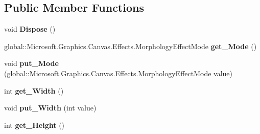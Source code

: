 \subsection*{Public Member Functions}
\begin{DoxyCompactItemize}
\item 
\mbox{\label{class_microsoft_1_1_graphics_1_1_canvas_1_1_effects_1_1_morphology_effect_a53c33ad9e69a2a3019abd0f92a5654ba}} 
void {\bfseries Dispose} ()
\item 
\mbox{\label{class_microsoft_1_1_graphics_1_1_canvas_1_1_effects_1_1_morphology_effect_abdb13862f058bf5f7dade04433564b08}} 
global\+::\+Microsoft.\+Graphics.\+Canvas.\+Effects.\+Morphology\+Effect\+Mode {\bfseries get\+\_\+\+Mode} ()
\item 
\mbox{\label{class_microsoft_1_1_graphics_1_1_canvas_1_1_effects_1_1_morphology_effect_a296213a0672d2738d42d1fa293d9dd00}} 
void {\bfseries put\+\_\+\+Mode} (global\+::\+Microsoft.\+Graphics.\+Canvas.\+Effects.\+Morphology\+Effect\+Mode value)
\item 
\mbox{\label{class_microsoft_1_1_graphics_1_1_canvas_1_1_effects_1_1_morphology_effect_a6f97be0b87a082ba8cb4b9ebc4f89d70}} 
int {\bfseries get\+\_\+\+Width} ()
\item 
\mbox{\label{class_microsoft_1_1_graphics_1_1_canvas_1_1_effects_1_1_morphology_effect_ac3f128cf3f9dcffa2e7ed06b0a827404}} 
void {\bfseries put\+\_\+\+Width} (int value)
\item 
\mbox{\label{class_microsoft_1_1_graphics_1_1_canvas_1_1_effects_1_1_morphology_effect_abcfe446fe92397d1c11d0b6227c48e3e}} 
int {\bfseries get\+\_\+\+Height} ()
\item 
\mbox{\label{class_microsoft_1_1_graphics_1_1_canvas_1_1_effects_1_1_morphology_effect_a8952cddc9fba06db55a0f9b692f3a53d}} 

\end{DoxyCompactItemize}
